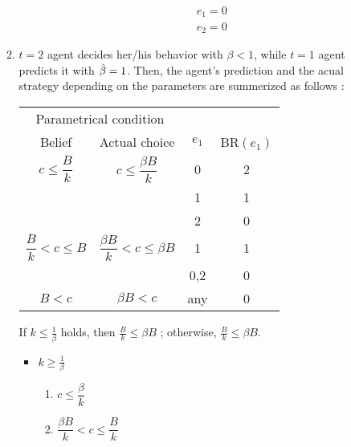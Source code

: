 \documentclass{jsarticle}
\begin{document}
\begin{enumerate}
\begin{enumerate}
\begin{itemize}
\begin{align*}
e_1=0 \\
e_2=0
\end{align*}

\end{itemize}

\newpage

\item

$t=2$ agent decides her/his behavior with $\beta<1$, while $t=1$ agent predicts it with $\Hat{\beta}=1$. Then, the agent's prediction and the acual strategy depending on the parameters are summerized as follows :


\begin{center}

 \begin{tabular}{cccc} \hline
 \multicolumn{2}{c}{Parametrical condition} & & \\
 \multicolumn{1}{c}{Belief} & \multicolumn{1}{c}{Actual choice} & $e_1$ & BR$(e_1)$ \\ \hline
 $c \leq \dfrac{B}{k}$ & $c \leq \dfrac{\beta B}{k}$ & 0 &2 \\
  & & 1 & 1 \\
  & & 2 & 0 \\
 $\dfrac{B}{k} < c \leq B$ & $\dfrac{\beta B}{k} < c \leq \beta B$ & 1 &1 \\
  & & 0,2 & 0 \\
 $B < c$ & $\beta B < c$ & any & 0 \\ \hline
 \end{tabular}

\end{center}

\vspace{1zw}

If $k \leq \frac{1}{\beta}$ holds, then $\frac{B}{k} \leq \beta B$ ; otherwise, $\frac{B}{k} \leq \beta B$.

\begin{itemize}

\item $k \geq \frac{1}{\beta}$

 \begin{enumerate}
 
 \item $c \leq \dfrac{\beta}{k}$
 
 
 
 \item $ \dfrac{\beta B}{k} < c \leq \dfrac{B}{k} $
 
 
 

\end{enumerate}
\end{itemize}
\end{enumerate}
\end{enumerate}
\end{document}
